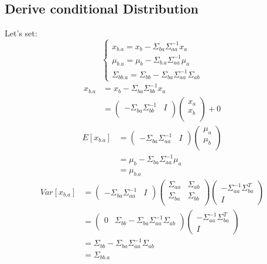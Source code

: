 \documentclass{report}
\begin{document}
\subsection{Derive conditional Distribution}
Let's set:
$$
\begin{cases}
x_{b.a}=x_b - \Sigma_{ba} \Sigma_{aa}^{-1} x_a \\
\mu_{b.a} = \mu_b - \Sigma_{b.a} \Sigma_{aa}^{-1} \mu_a \\
\Sigma_{bb.a}=\Sigma_{bb} - \Sigma_{ba} \Sigma_{aa}^{-1} \Sigma_{ab}
\end{cases}
$$
$$
\begin{aligned}
x_{b.a} &= x_b - \Sigma_{ba} \Sigma_{bb}^{-1} x_a \\
&=
\left (
\begin{matrix}
- \Sigma_{ba} \Sigma_{bb}^{-1} & I\\
\end{matrix}
\right )
\left (
\begin{matrix}
x_a \\
x_b \\
\end{matrix}
\right ) + 0
\end{aligned}
$$
$$
\begin{aligned}
E[x_{b.a}]
&=
\left (
\begin{matrix}
-\Sigma_{ba} \Sigma_{aa}^{-1} & I
\end{matrix}
\right )
\left (
\begin{matrix}
\mu_a \\
\mu_b \\
\end{matrix}
\right )\\
&=\mu_b - \Sigma_{ba} \Sigma_{aa}^{-1} \mu_a\\
&=\mu_{b.a}
\end{aligned}
$$
$$
\begin{aligned}
Var[x_{b.a}]
&= \left ( \begin{matrix}
-\Sigma_{ba} \Sigma_{aa}^{-1} & I
\end{matrix} \right )
\left ( \begin{matrix}
\Sigma_{aa} & \Sigma_{ab} \\
\Sigma_{ba} & \Sigma_{bb} \\
\end{matrix} \right )
\left ( \begin{matrix}
-\Sigma_{aa}^{-1} \Sigma_{ba}^T \\
I
\end{matrix} \right ) \\
&=\left ( \begin{matrix}
0 & \Sigma_{bb} - \Sigma_{ba} \Sigma_{aa}^{-1} \Sigma_{ab} \\
\end{matrix} \right ) 
\left ( \begin{matrix}
-\Sigma_{aa}^{-1} \Sigma_{ba}^T \\
I
\end{matrix} \right ) \\
&=\Sigma_{bb} - \Sigma_{ba} \Sigma_{aa}^{-1} \Sigma_{ab}\\
&=\Sigma_{bb.a}
\end{aligned}
$$
\end{document}
